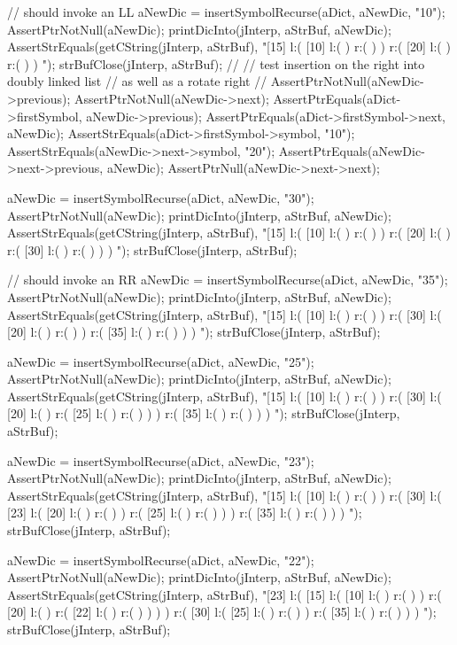   // should invoke an LL
  aNewDic = insertSymbolRecurse(aDict, aNewDic, "10");
  AssertPtrNotNull(aNewDic);
  printDicInto(jInterp, aStrBuf, aNewDic);
  AssertStrEquals(getCString(jInterp, aStrBuf),
  "[15] l:( [10] l:(  ) r:(  )  ) r:( [20] l:(  ) r:(  )  ) ");
  strBufClose(jInterp, aStrBuf);
  //
  // test insertion on the right into doubly linked list
  // as well as a rotate right
  //
  AssertPtrNotNull(aNewDic->previous);
  AssertPtrNotNull(aNewDic->next);
  AssertPtrEquals(aDict->firstSymbol, aNewDic->previous);
  AssertPtrEquals(aDict->firstSymbol->next, aNewDic);
  AssertStrEquals(aDict->firstSymbol->symbol, "10");
  AssertStrEquals(aNewDic->next->symbol, "20");
  AssertPtrEquals(aNewDic->next->previous, aNewDic);
  AssertPtrNull(aNewDic->next->next);

  aNewDic = insertSymbolRecurse(aDict, aNewDic, "30");
  AssertPtrNotNull(aNewDic);
  printDicInto(jInterp, aStrBuf, aNewDic);
  AssertStrEquals(getCString(jInterp, aStrBuf),
  "[15] l:( [10] l:(  ) r:(  )  ) r:( [20] l:(  ) r:( [30] l:(  ) r:(  )  )  ) ");
  strBufClose(jInterp, aStrBuf);
  
  // should invoke an RR
  aNewDic = insertSymbolRecurse(aDict, aNewDic, "35");
  AssertPtrNotNull(aNewDic);
  printDicInto(jInterp, aStrBuf, aNewDic);
  AssertStrEquals(getCString(jInterp, aStrBuf),
  "[15] l:( [10] l:(  ) r:(  )  ) r:( [30] l:( [20] l:(  ) r:(  )  ) r:( [35] l:(  ) r:(  )  )  ) ");
  strBufClose(jInterp, aStrBuf);

  aNewDic = insertSymbolRecurse(aDict, aNewDic, "25");
  AssertPtrNotNull(aNewDic);
  printDicInto(jInterp, aStrBuf, aNewDic);
  AssertStrEquals(getCString(jInterp, aStrBuf),
  "[15] l:( [10] l:(  ) r:(  )  ) r:( [30] l:( [20] l:(  ) r:( [25] l:(  ) r:(  )  )  ) r:( [35] l:(  ) r:(  )  )  ) ");
  strBufClose(jInterp, aStrBuf);

  aNewDic = insertSymbolRecurse(aDict, aNewDic, "23");
  AssertPtrNotNull(aNewDic);
  printDicInto(jInterp, aStrBuf, aNewDic);
  AssertStrEquals(getCString(jInterp, aStrBuf),
  "[15] l:( [10] l:(  ) r:(  )  ) r:( [30] l:( [23] l:( [20] l:(  ) r:(  )  ) r:( [25] l:(  ) r:(  )  )  ) r:( [35] l:(  ) r:(  )  )  ) ");
  strBufClose(jInterp, aStrBuf);
  
  aNewDic = insertSymbolRecurse(aDict, aNewDic, "22");
  AssertPtrNotNull(aNewDic);
  printDicInto(jInterp, aStrBuf, aNewDic);
  AssertStrEquals(getCString(jInterp, aStrBuf),
  "[23] l:( [15] l:( [10] l:(  ) r:(  )  ) r:( [20] l:(  ) r:( [22] l:(  ) r:(  )  )  )  ) r:( [30] l:( [25] l:(  ) r:(  )  ) r:( [35] l:(  ) r:(  )  )  ) ");
  strBufClose(jInterp, aStrBuf);
  
